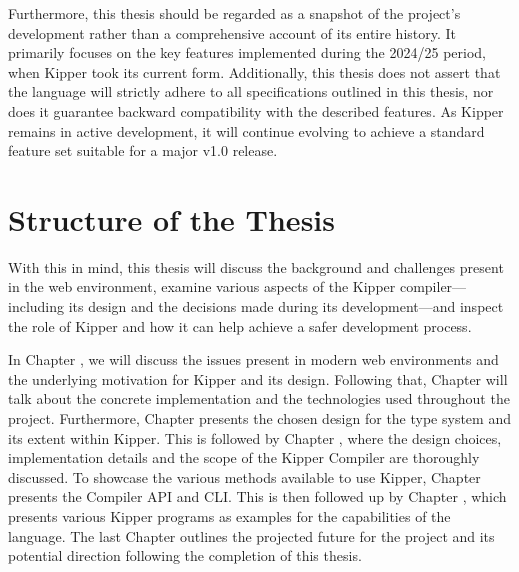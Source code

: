 Furthermore, this thesis should be regarded as a snapshot of the project's development rather than a comprehensive account of its entire history. It primarily focuses on the key features implemented during the 2024/25 period, when Kipper took its current form. Additionally, this thesis does not assert that the language will strictly adhere to all specifications outlined in this thesis, nor does it guarantee backward compatibility with the described features. As Kipper remains in active development, it will continue evolving to achieve a standard feature set suitable for a major v1.0 release.

\section{Structure of the Thesis}

With this in mind, this thesis will discuss the background and challenges present in the web environment, examine various aspects of the Kipper compiler—including its design and the decisions made during its development—and inspect the role of Kipper and how it can help achieve a safer development process.

In Chapter , we will discuss the issues present in modern web environments and the underlying motivation for Kipper and its design. Following that, Chapter  will talk about the concrete implementation and the technologies used throughout the project. Furthermore, Chapter  presents the chosen design for the type system and its extent within Kipper. This is followed by Chapter , where the design choices, implementation details and the scope of the Kipper Compiler are thoroughly discussed. To showcase the various methods available to use Kipper, Chapter  presents the Compiler API and CLI. This is then followed up by Chapter , which presents various Kipper programs as examples for the capabilities of the language. The last Chapter  outlines the projected future for the project and its potential direction following the completion of this thesis.

